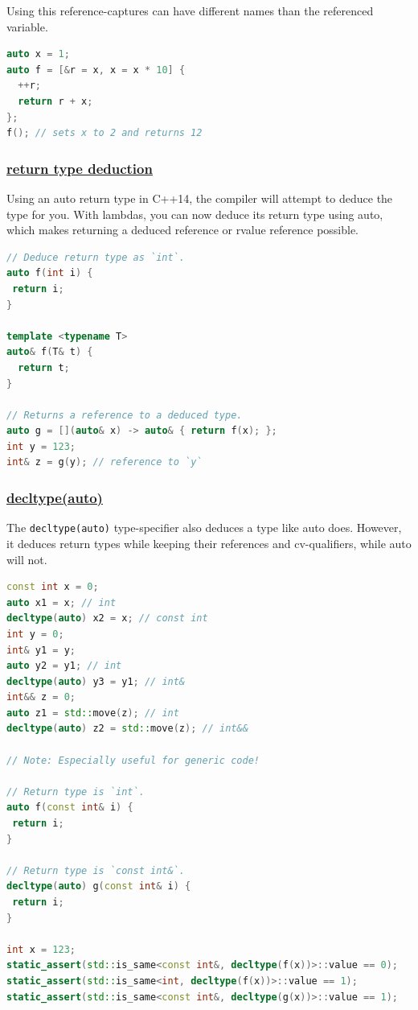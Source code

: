 Using this reference-captures can have different names than the referenced variable.
\begin{lstlisting}[language=C++]
auto x = 1;
auto f = [&r = x, x = x * 10] {
  ++r;
  return r + x;
};
f(); // sets x to 2 and returns 12
\end{lstlisting}

\subsubsection{\href{https://github.com/AnthonyCalandra/modern-cpp-features/tree/master\#return-type-deduction}
                    {return type deduction}}
Using an auto return type in C++14, the compiler will attempt to deduce 
the type for you. With lambdas, you can now deduce its return type using 
auto, which makes returning a deduced reference or rvalue reference possible.
\begin{lstlisting}[language=C++]
// Deduce return type as `int`.
auto f(int i) {
 return i;
}

template <typename T>
auto& f(T& t) {
  return t;
}

// Returns a reference to a deduced type.
auto g = [](auto& x) -> auto& { return f(x); };
int y = 123;
int& z = g(y); // reference to `y`
\end{lstlisting}

\subsubsection{\href{https://github.com/AnthonyCalandra/modern-cpp-features/tree/master\#decltypeauto}
                    {decltype(auto)}}
The \texttt{decltype(auto)} type-specifier also deduces a type like auto does. 
However, it deduces return types while keeping their references and 
cv-qualifiers, while auto will not.
\begin{lstlisting}[language=C++]
const int x = 0;
auto x1 = x; // int
decltype(auto) x2 = x; // const int
int y = 0;
int& y1 = y;
auto y2 = y1; // int
decltype(auto) y3 = y1; // int&
int&& z = 0;
auto z1 = std::move(z); // int
decltype(auto) z2 = std::move(z); // int&&

// Note: Especially useful for generic code!

// Return type is `int`.
auto f(const int& i) {
 return i;
}

// Return type is `const int&`.
decltype(auto) g(const int& i) {
 return i;
}

int x = 123;
static_assert(std::is_same<const int&, decltype(f(x))>::value == 0);
static_assert(std::is_same<int, decltype(f(x))>::value == 1);
static_assert(std::is_same<const int&, decltype(g(x))>::value == 1);
\end{lstlisting}


